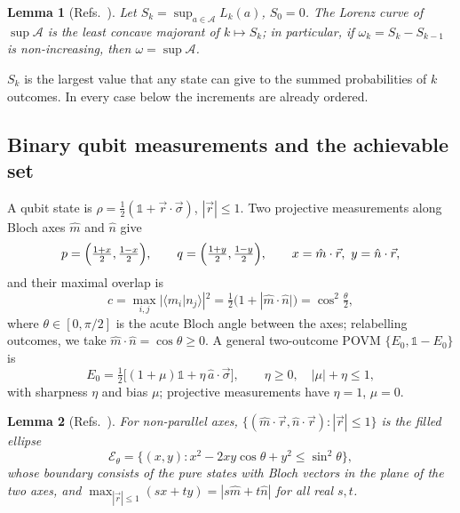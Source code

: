 \documentclass[11pt]{article}
\newtheorem{lemma}{Lemma}
\theoremstyle{definition}
\newcommand{\vecr}{\vec r}
\newcommand{\mhat}{\hat m}
\newcommand{\nhat}{\hat n}
\newcommand{\vsigma}{\vec\sigma}
\begin{document}
\begin{lemma}[Refs.~]\label{lem:sup}
Let $S_k=\sup_{a\in\mathcal A}L_k(a)$, $S_0=0$. The Lorenz curve of $\sup\mathcal A$
is the least concave majorant of $k\mapsto S_k$; in particular, if
$\omega_k=S_k-S_{k-1}$ is non-increasing, then $\omega=\sup\mathcal A$.
\end{lemma}

$S_k$ is the largest value that any state can give to the summed probabilities
of $k$ outcomes. In every case below the increments are already ordered.

\subsection*{Binary qubit measurements and the achievable set}

A qubit state is $\rho=\frac12(\mathbb 1+\vecr\cdot\vsigma)$, $|\vecr|\le1$. Two
projective measurements along Bloch axes $\mhat$ and $\nhat$ give
\begin{equation}
  p=\Bigl(\tfrac{1+x}2,\tfrac{1-x}2\Bigr),\qquad
  q=\Bigl(\tfrac{1+y}2,\tfrac{1-y}2\Bigr),\qquad x=\mhat\cdot\vecr,\ y=\nhat\cdot\vecr,
  \label{eq:pq}
\end{equation}
and their maximal overlap is
\begin{equation}
  c=\max_{i,j}|\langle m_i|n_j\rangle|^2=\tfrac12\bigl(1+|\mhat\cdot\nhat|\bigr)=\cos^2\tfrac\theta2,
  \label{eq:c}
\end{equation}
where $\theta\in[0,\pi/2]$ is the acute Bloch angle between the axes; relabelling
outcomes, we take $\mhat\cdot\nhat=\cos\theta\ge0$. A general two-outcome POVM
$\{E_0,\mathbb 1-E_0\}$ is
\begin{equation}
  E_0=\tfrac12\bigl[(1+\mu)\mathbb 1+\eta\,\hat a\cdot\vsigma\bigr],\qquad
  \eta\ge0,\quad|\mu|+\eta\le1,
  \label{eq:povm}
\end{equation}
with sharpness $\eta$ and bias $\mu$; projective measurements have $\eta=1$,
$\mu=0$.

\begin{lemma}[Refs.~]\label{lem:ellipse}
For non-parallel axes, $\{(\mhat\cdot\vecr,\nhat\cdot\vecr):|\vecr|\le1\}$ is the filled ellipse
\begin{equation}
  \mathcal E_\theta=\{(x,y):x^2-2xy\cos\theta+y^2\le\sin^2\theta\},
  \label{eq:ellipse}
\end{equation}
whose boundary consists of the pure states with Bloch vectors in the plane of
the two axes, and $\max_{|\vecr|\le1}(sx+ty)=|s\mhat+t\nhat|$ for all real $s,t$.
\end{lemma}
\end{document}
